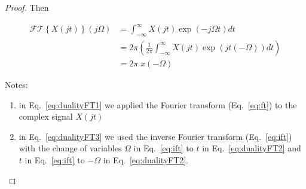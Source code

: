 \documentclass[12pt]{article}
\begin{document}
\begin{appendices}
\begin{proof}
        Then

        \begin{align}
            \mathcal{FT}\left\{X(jt)\right\}(j\Omega)&=\int_{-\infty}^\infty X(jt)\exp\left(-j\Omega t\right)dt\label{eq:dualityFT1}\\
                                                     &=2\pi\left(\frac{1}{2\pi}\int_{-\infty}^\infty X(jt)\exp\left(jt(-\Omega)\right)dt\right)\label{eq:dualityFT2}\\
                                                     &=2\pi\;x(-\Omega)\label{eq:dualityFT3}
        \end{align}

        Notes:

        \begin{enumerate}

            \item in Eq.~\ref{eq:dualityFT1} we applied the Fourier transform (Eq.~\ref{eq:ft}) to the complex signal $X(jt)$

            \item in Eq.~\ref{eq:dualityFT3} we used the inverse Fourier
                transform (Eq.~\ref{eq:ift}) with the change of variables
                $\Omega$ in Eq.~\ref{eq:ift} to $t$ in Eq.~\ref{eq:dualityFT2}
                and $t$ in Eq.~\ref{eq:ift} to $-\Omega$ in
                Eq.~\ref{eq:dualityFT2}.

        \end{enumerate}
    \end{proof}

    \begin{comment}
In Exercise~1, for $i=1,\ldots,1000$, we generated samples from random variables
$\{x_{(i,1)},\ldots,x_{(i,10000)}\}$, from these samples we computed a t-statistic
$t_i=f(x_{(i,1)},\ldots,x_{(i,10000)})$, and from this statistic we calculated a
p-value, $p_i=g(t_i)$. Because the t-statistic is a function, $f$, of random
variables, it can be considered as a random variable, $T$. Because the
p-value is a function, $g$, of a random variables, it can also be considered as
a random variable, $P$. The goal of this section is to prove that the p-value random
variable is uniformly distributed in [0,1]; i.e., $P\sim\mathcal{U}[0,1]$. This
proof is given in Lemma~\ref{lemma:p_values_uniform01}. Before giving this
proof we prove two auxiliary claims (Claims~\ref{claim:pvalue_as_function_of_stat}
and~\ref{claim:uniform_cummulative}).

Fig.~\ref{fig:pvalue} illustrates the concept of a p-value. It is the
probability of observing a statistic, $t$, greater than the observed one,
$t_\text{obs}$, when the null hypothesis is true.


\end{comment}
\end{appendices}
\end{document}
